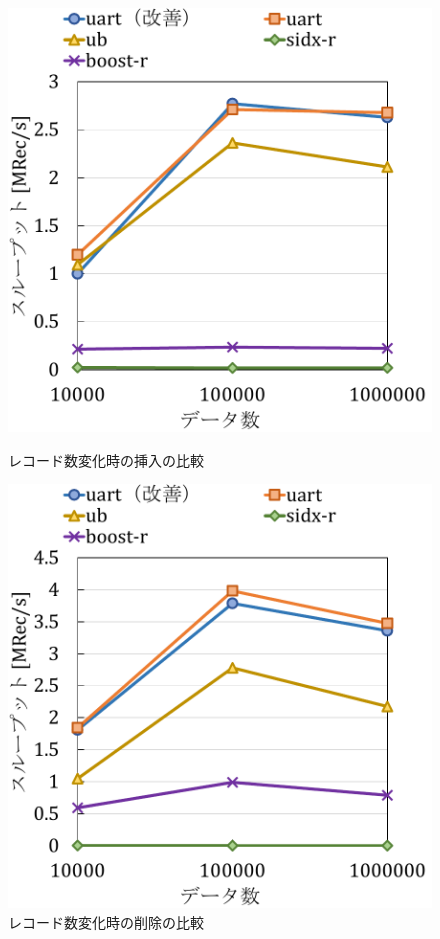 \begin{figure}[tb]
  \begin{minipage}[c]{0.495\textwidth}
    \centering
    \includegraphics[scale=0.5]{./figures/graph-datasize-insert.pdf}
    \caption{レコード数変化時の挿入の比較}
    \label{graph:rec-ins}
  \end{minipage}
  \begin{minipage}[c]{0.495\textwidth}
    \centering
    \includegraphics[scale=0.5]{./figures/graph-datasize-delete.pdf}
    \caption{レコード数変化時の削除の比較}
    \label{graph:rec-del}
  \end{minipage}
\end{figure}
